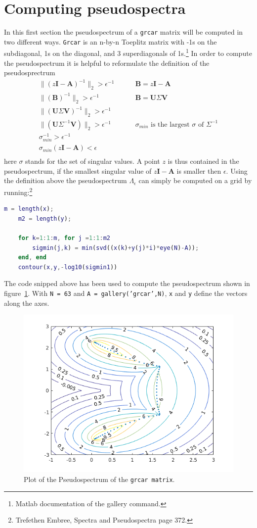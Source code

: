 \section{Computing pseudospectra}
In this first section the pseudospectrum of a \texttt{grcar} matrix will be computed in two different ways. \texttt{Grcar} is an n-by-n Toeplitz matrix with -1s on the subdiagonal, 1s on the diagonal, and 3 superdiagonals of 1s.\footnote{Matlab documentation of the gallery command.} In order to compute the pseudospectrum it is helpful to reformulate the definition of the pseudosprectrum
\begin{align}
\| (z\mathbf{I} - \mathbf{A})^{-1} \|_2 > \epsilon^{-1} & \;\;\;\;\;\;\;\; \mathbf{B} = z\mathbf{I} - \mathbf{A}      \\
\| (\mathbf{B})^{-1} \|_2 > \epsilon^{-1}               & \;\;\;\;\;\;\;\; \mathbf{B} = \mathbf{U} \Sigma \mathbf{V}  \\
\| (\mathbf{U} \Sigma \mathbf{V})^{-1} \|_2 > \epsilon^{-1} \\
\| (\mathbf{U} \Sigma^{-1} \mathbf{V}) \|_2 > \epsilon^{-1} & \;\;\;\;\;\;\;\; \text{$\sigma_{min}$ is the largest $\sigma$ of $\Sigma^{-1}$}  \\
\sigma_{min}^{-1} > \epsilon^{-1} \\
\sigma_{min}(z\mathbf{I} - \mathbf{A}) < \epsilon \\
\label{eq:pseudo}
\end{align}
here $\sigma$ stands for the set of singular values. A point $z$ is thus contained in the pseudospectrum, if the smallest singular value of $z\mathbf{I} - \mathbf{A}$ is smaller then $\epsilon$. Using the definition above the pseudospectrum $\Lambda_\epsilon$ can simply be computed on a grid by running:\footnote{Trefethen Embree, Spectra and Pseudospectra page 372.}
\begin{lstlisting}[language = matlab]
	m = length(x);
	m2 = length(y);	

	for k=1:1:m, for j =1:1:m2
		sigmin(j,k) = min(svd((x(k)+y(j)*i)*eye(N)-A));
	end, end
	contour(x,y,-log10(sigmin1))
\end{lstlisting}
The code snipped above has been used to compute the pseudospectrum shown in figure~\ref{fig:pseudoGrcar}. With \texttt{N = 63} and \texttt{A = gallery('grcar',N)}, \texttt{x} and \texttt{y} define the vectors along the axes. 
\begin{figure}
\centering
\includegraphics[width=0.5\linewidth]{../src/figures/grcar}
\caption{Plot of the Pseudospectrum of the \texttt{grcar matrix}.}
\label{fig:pseudoGrcar}
\end{figure}

